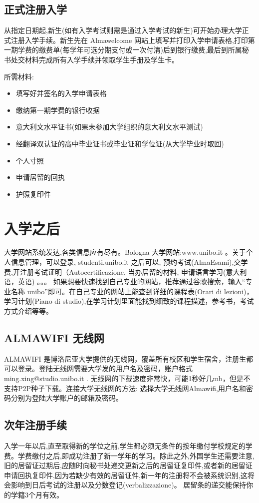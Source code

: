 \subsection{正式注册入学}
从指定日期起,新生(如有入学考试则需是通过入学考试的新生)可开始办理大学正式注册入学手续。新生先在 Almawelcome 网站上填写并打印入学申请表格,打印第一期学费的缴费单(每学年可选分期支付或一次付清)后到银行缴费,最后到所属秘书处交材料完成所有入学手续并领取学生手册及学生卡。 

所需材料:
\begin{itemize}
\item 填写好并签名的入学申请表格 
\item 缴纳第一期学费的银行收据 
\item 意大利文水平证书(如果未参加大学组织的意大利文水平测试) 
\item 经翻译双认证的高中毕业证书或毕业证和学位证(从大学毕业时取回)
\item 个人寸照
\item 申请居留的回执
\item 护照复印件 
\end{itemize}




\section{入学之后}
大学网站系统发达,各类信息应有尽有。Bologna 大学网站:www.unibo.it 。关于个人信息管理，可以登录, studenti.unibo.it 之后可以, 预约考试(AlmaEsami),交学费,开注册考试证明（Autocertificazione, 当办居留的材料, 申请语言学习(意大利语，英语) 。。。
如果想要快速找到自己专业的网站，推荐通过谷歌搜索，输入“专业名称 unibo”即可。在自己专业的网站上能查到详细的课程表(Orari di lezioni)，学习计划(Piano di studio),在学习计划里面能找到细致的课程描述，参考书，考试方式介绍等等。

\subsection{ALMAWIFI 无线网}
ALMAWIFI 是博洛尼亚大学提供的无线网，覆盖所有校区和学生宿舍，注册生都可以登录。登陆无线网需要大学发的用户名及密码，账户格式 ming.xing@studio.unibo.it . 无线网的下载速度非常快，可能1秒好几mb，但是不支持P2P种子下载。连接大学无线网的方法: 选择大学无线网Almawifi,用户名和密码分别为登陆大学账户的邮箱及密码。

\subsection{次年注册手续}
入学一年以后,直至取得新的学位之前,学生都必须无条件的按年缴付学校规定的学费。学费缴付之后,即成功注册了新一学年的学习。除此之外,外国学生还需要注意,旧的居留证过期后,应随时向秘书处递交更新之后的居留证复印件,或者新的居留证申请回执复印件,因为若缺少有效的居留证件,新一年的注册将不会被系统识别,这将会影响到日后考试的注册以及分数登记(verbalizzazione)。 居留条的递交能保持你的学籍3个月有效。

